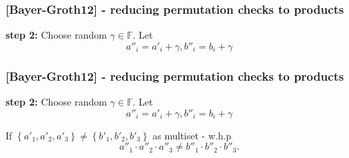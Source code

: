 \documentclass[shadesubsections,trans,14pt,mathserif]{beamer}
\newcommand{\F}{\ensuremath{\mathbb F}}
\newcommand{\set}[1]{\ensuremath{\left\{#1\right\}}}
\begin{document}
\begin{frame}
\frametitle{{\normalsize{[Bayer-Groth12]}} - reducing permutation checks to products}   %

\textbf{step 2:} Choose random $\gamma\in \F$. Let
 \[a''_i=a'_i +\gamma, b''_i = b_i + \gamma\]
 
 
 \vspace{0.2in}


\end{frame}
\begin{frame}
\frametitle{{\normalsize{[Bayer-Groth12]}} - reducing permutation checks to products}   %

\textbf{step 2:} Choose random $\gamma\in \F$. Let
 \[a''_i=a'_i +\gamma, b''_i = b_i + \gamma\]
 
 
 \vspace{0.2in}

If $\set{a'_1,a'_2,a'_3}\neq \set{b'_1,b'_2,b'_3}$ as multiset - w.h.p  \[a''_1\cdot a''_2\cdot a''_3 \neq b''_1\cdot b''_2\cdot b''_3.\]  

\end{frame}

% 
\end{document}
